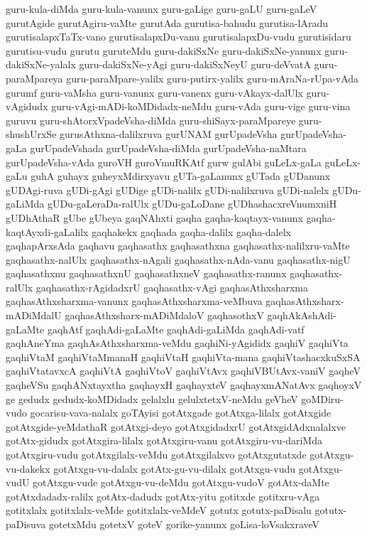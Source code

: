 {guru-kula-diMda
guru-kula-vanunx
guru-gaLige
guru-gaLU
guru-gaLeV
gurutAgide
gurutAgiru-vaMte
gurutAda
gurutisa-bahudu
gurutisa-lAradu
gurutisalapxTaTx-vano
gurutisalapxDu-vanu
gurutisalapxDu-vudu
gurutisidaru
gurutisu-vudu
gurutu
guruteMdu
guru-dakiSxNe
guru-dakiSxNe-yanunx
guru-dakiSxNe-yalalx
guru-dakiSxNe-yAgi
guru-dakiSxNeyU
guru-deVvatA
guru-paraMpareya
guru-paraMpare-yalilx
guru-putirx-yalilx
guru-mAraNa-rUpa-vAda
gurumf
guru-vaMsha
guru-vanunx
guru-vanenx
guru-vAkayx-dalUlx
guru-vAgidudx
guru-vAgi-mADi-koMDidadx-neMdu
guru-vAda
guru-vige
guru-vina
guruvu
guru-shAtorxVpadeVsha-diMda
guru-shiSayx-paraMpareye
guru-shushUrxSe
gurusAthxna-dalilxruva
gurUNAM
gurUpadeVsha
gurUpadeVsha-gaLa
gurUpadeVshada
gurUpadeVsha-diMda
gurUpadeVsha-naMtara
gurUpadeVsha-vAda
guroVH
guroVmuRKAtf
gurw
gulAbi
guLeLx-gaLa
guLeLx-gaLu
guhA
guhayx
guheyxMdirxyavu
gUTa-gaLanunx
gUTada
gUDanunx
gUDAgi-ruva
gUDi-gAgi
gUDige
gUDi-nalilx
gUDi-nalilxruva
gUDi-nalelx
gUDu-gaLiMda
gUDu-gaLeraDa-ralUlx
gUDu-gaLoDane
gUDhashacxreVnumxniH
gUDhAthaR
gUbe
gUbeya
gaqNAhxti
gaqha
gaqha-kaqtayx-vanunx
gaqha-kaqtAyxdi-gaLalilx
gaqhakekx
gaqhada
gaqha-dalilx
gaqha-dalelx
gaqhapArxsAda
gaqhavu
gaqhasathx
gaqhasathxna
gaqhasathx-nalilxru-vaMte
gaqhasathx-nalUlx
gaqhasathx-nAgali
gaqhasathx-nAda-vanu
gaqhasathx-nigU
gaqhasathxnu
gaqhasathxnU
gaqhasathxneV
gaqhasathx-ranunx
gaqhasathx-ralUlx
gaqhasathx-rAgidadxrU
gaqhasathx-vAgi
gaqhasAthxsharxma
gaqhasAthxsharxma-vanunx
gaqhasAthxsharxma-veMbuva
gaqhasAthxsharx-mADiMdalU
gaqhasAthxsharx-mADiMdaloV
gaqhasothxV
gaqhAkAshAdi-gaLaMte
gaqhAtf
gaqhAdi-gaLaMte
gaqhAdi-gaLiMda
gaqhAdi-vatf
gaqhAneYma
gaqhAsAthxsharxma-veMdu
gaqhiNi-yAgididx
gaqhiV
gaqhiVta
gaqhiVtaM
gaqhiVtaMmanaH
gaqhiVtaH
gaqhiVta-mana
gaqhiVtashacxkuSxSA
gaqhiVtatavxcA
gaqhiVtA
gaqhiVtoV
gaqhiVtAvx
gaqhiVBUtAvx-vaniV
gaqheV
gaqheVSu
gaqhANxtayxtha
gaqhayxH
gaqhayxteV
gaqhayxmANatAvx
gaqhoyxV
ge
gedudx
gedudx-koMDidadx
gelalxlu
gelulxtetxV-neMdu
geVheV
goMDiru-vudo
gocarisu-vava-nalalx
goTAyisi
gotAtxgade
gotAtxga-lilalx
gotAtxgide
gotAtxgide-yeMdathaR
gotAtxgi-deyo
gotAtxgidadxrU
gotAtxgidAdxnalalxve
gotAtx-gidudx
gotAtxgira-lilalx
gotAtxgiru-vanu
gotAtxgiru-vu-dariMda
gotAtxgiru-vudu
gotAtxgilalx-veMdu
gotAtxgilalxvo
gotAtxgutatxde
gotAtxgu-vu-dakekx
gotAtxgu-vu-dalalx
gotAtx-gu-vu-dilalx
gotAtxgu-vudu
gotAtxgu-vudU
gotAtxgu-vude
gotAtxgu-vu-deMdu
gotAtxgu-vudoV
gotAtx-daMte
gotAtxdadadx-ralilx
gotAtx-dadudx
gotAtx-yitu
gotitxde
gotitxru-vAga
gotitxlalx
gotitxlalx-veMde
gotitxlalx-veMdeV
gotutx
gotutx-paDisalu
gotutx-paDisuva
gotetxMdu
gotetxV
goteV
gorike-yanunx
goLisa-loVsakxraveV
}
